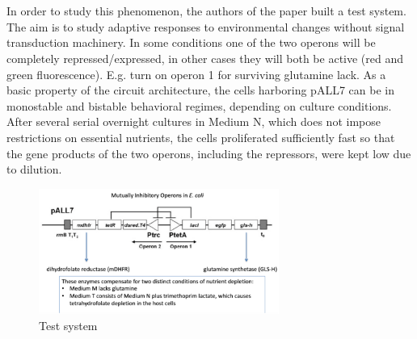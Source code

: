\\
\\
\noindent
In order to study this phenomenon, the authors of the paper built a test system. The aim is to study adaptive responses to environmental changes without signal transduction machinery. 
In some conditions one of the two operons will be completely repressed/expressed, in other cases they will both be active (red and green fluorescence). E.g. turn on operon 1 for surviving glutamine lack.
\noindent
As a basic property of the circuit architecture, the cells harboring pALL7 can be in monostable and bistable behavioral regimes, depending on culture conditions. After several serial overnight cultures in Medium N, which does not impose restrictions on essential nutrients, the cells proliferated sufficiently fast so that the gene products of the two operons, including the repressors, were kept low due to dilution. 

\begin{figure}[h]
\includegraphics[width=0.7\textwidth]{test_operon_coli}
\caption{\label{fig:test} Test system}
\end{figure}

